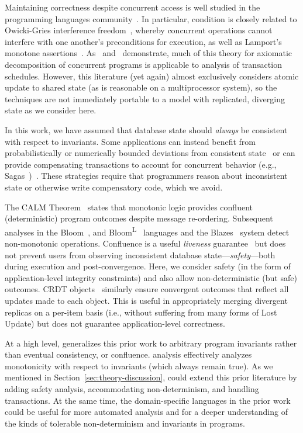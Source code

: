 Maintaining correctness despite concurrent
access is well studied in the programming languages
community~\cite{schneider-concurrent}. In particular, \iconfluence
condition is closely related to Owicki-Gries interference
freedom~\cite{owickigries}, whereby concurrent operations cannot
interfere with one another's preconditions for execution, as well as
Lamport's monotone
assertions~\cite{schneider-concurrent}. As~\cite{agarwal-consistency}
and~\cite{decomp-semantics} demonstrate, much of this theory for
axiomatic decomposition of concurrent programs is applicable to
analysis of transaction schedules. However, this literature (yet
again) almost exclusively considers atomic update to shared state (as
is reasonable on a multiprocessor system), so the techniques are not
immediately portable to a model with replicated, diverging state as we
consider here.

 In this work, we have assumed that
database state should \textit{always} be consistent with respect to
invariants. Some applications can instead benefit from
probabilistically or numerically bounded deviations from consistent
state~\cite{epsilon-divergence} or can provide compensating
transactions to account for concurrent behavior (e.g.,
Sagas~\cite{sagas})~\cite{ic-survey,ic-survey-two}. These strategies
require that programmers reason about inconsistent state or otherwise
write compensatory code, which we avoid.

 The CALM
Theorem~\cite{ameloot-calm} states that monotonic logic provides
confluent (deterministic) program outcomes despite message
re-ordering. Subsequent analyses in the Bloom~\cite{calm}, and
Bloom\textsuperscript{L}~\cite{blooml} languages and the
Blazes~\cite{blazes} system detect non-monotonic
operations. Confluence is a useful \textit{liveness}
guarantee~\cite{schneider-concurrent} but does not prevent users from
observing inconsistent database state---\textit{safety}---both during
execution and post-convergence. Here, we consider safety (in the form
of application-level integrity constraints) and also allow
non-deterministic (but safe) outcomes. CRDT objects~\cite{crdt}
similarly ensure convergent outcomes that reflect all updates made to
each object. This is useful in appropriately merging divergent
replicas on a per-item basis (i.e., without suffering from many forms
of Lost Update) but does not guarantee application-level correctness.

At a high level, \iconfluence generalizes this prior work to arbitrary
program invariants rather than eventual consistency, or confluence.
\iconfluence analysis effectively analyzes monotonicity with respect
to invariants (which always remain true). As we mentioned in
Section~\ref{sec:theory-discussion}, \iconfluence could extend this
prior literature by adding safety analysis, accommodating
non-determinism, and handling transactions.  At the same time, the
domain-specific languages in the prior work could be useful for more
automated \iconfluence analysis and for a deeper understanding of the
kinds of tolerable non-determinism and invariants in \iconfluent
programs.

